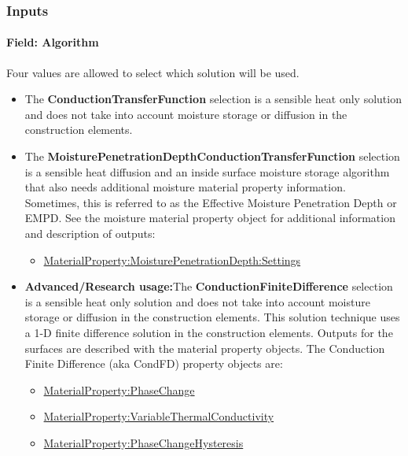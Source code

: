 \subsubsection{Inputs}\label{inputs-6-025}

\paragraph{Field: Algorithm}\label{field-algorithm-2-000}

Four values are allowed to select which solution will be used.

\begin{itemize}
    \item
    The \textbf{ConductionTransferFunction} selection is a sensible heat only solution and does not take into account moisture storage or diffusion in the construction elements.
    \item
    The \textbf{MoisturePenetrationDepthConductionTransferFunction} selection is a sensible heat diffusion and an inside surface moisture storage algorithm that also needs additional moisture material property information. Sometimes, this is referred to as the Effective Moisture Penetration Depth or EMPD. See the moisture material property object for additional information and description of outputs:
    \begin{itemize}
        \item
        \hyperref[materialpropertymoisturepenetrationdepthsettings]{MaterialProperty:MoisturePenetrationDepth:Settings}
    \end{itemize}
    \item
    \textbf{Advanced/Research usage:}The \textbf{ConductionFiniteDifference} selection is a sensible heat only solution and does not take into account moisture storage or diffusion in the construction elements. This solution technique uses a 1-D finite difference solution in the construction elements. Outputs for the surfaces are described with the material property objects. The Conduction Finite Difference (aka CondFD) property objects are:
    \begin{itemize}
        \item
        \hyperref[materialpropertyphasechange]{MaterialProperty:PhaseChange}
        \item
        \hyperref[materialpropertyvariablethermalconductivity]{MaterialProperty:VariableThermalConductivity}
        \item
        \hyperref[materialpropertyphasechangehysteresis]{MaterialProperty:PhaseChangeHysteresis}

\end{itemize}
\end{itemize}
